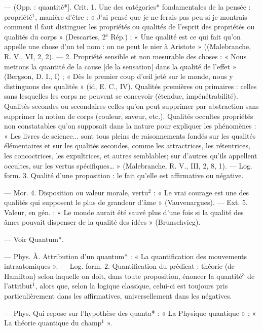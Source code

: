 	\begin{itemize}[leftmargin=1cm, label=, itemsep=1pt]
 — (Opp. : quantité*]. Crit.
1. Une des catégories* fondamentales de la pensée : propriété$^1$, manière d’être : « J’ai pensé que je ne
ferais pas peu si je montrais comment il faut distinguer les propriétés ou qualités de l'esprit des propriétés ou qualités du corps » (Descartes, 2$^\text{e}$ Rép.) ; « Une qualité est ce
qui fait qu'on appelle une chose
d’un tel nom : on ne peut le nier à
Aristote » ((Malebranche, R. V.,
VI, 2, 2). — 2. Propriété sensible
et non mesurable des choses : « Nous
mettons la quantité de la cause [de
la sensation] dans la qualité de
l'effet » (Bergson, D. I., I) ; « Dès le
premier coup d'œil jeté sur le
monde, nous y distinguons des qualités » (id, E. C., IV). Qualités premières ou primaires : celles sans lesquelles les corps ne peuvent se concevoir (étendue, impénétrabilité).
Qualités secondes ou secondaires
celles qu'on peut supprimer par
abstraction sans supprimer la notion de corps (couleur, saveur, etc.).
Qualités occultes propriétés non
constatables qu’on supposait dans
la nature pour expliquer les phénomènes : « Les livres de science...
sont tous pleins de raisonnements
fondés sur les qualités élémentaires
et sur les qualités secondes, comme
les attractrices, les rétentrices, les
concoctrices, les expultrices, et autres
semblables; sur d’autres qu'ils appellent occultes, sur les vertus spécifiques… » (Malebranche, R. V., III,
2, 8, 1). — Log. form. 3. Qualité
d’une proposition : le fait qu'elle est
affirmative ou négative.

— Mor. 4. Disposition ou valeur
morale, vertu$^2$ : « Le vrai courage est
une des qualités qui supposent le
plus de grandeur d'âme » (Vauvenargues). — Ext. 5. Valeur, en
gén. : « Le monde aurait été sauvé
plus d’une fois si la qualité des âmes
pouvait dispenser de la qualité des
idées » (Brunschvicg).

 — Voir Quantum*.

 — Phys. À. Attribution d’un quantum* : « La quantification des mouvements intraatomiques ». — Log. form. 2. Quantification du prédicat : théorie (de
Hamilton) selon laquelle on doit,
dans toute proposition, énoncer la
quantité$^3$ de l’attribut$^1$, alors que,
selon la logique classique, celui-ci
est toujours pris particulièrement
dans les affirmatives, universellement dans les négatives.

 — Phys. Qui repose sur
l'hypothèse des quanta* : « La Physique quantique » ; « La théorie
quantique du champ$^1$ ».


\end{itemize}
